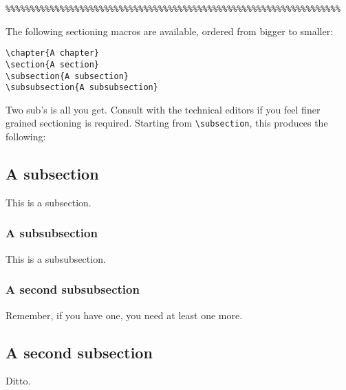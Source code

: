 \begin{verbatim}
%%%%%%%%%%%%%%%%%%%%%%%%%%%%%%%%%%%%%%%%%%%%%%%%%%%%%%%%%%%%%%%%%%%%
\end{verbatim}

The following sectioning macros are available, ordered from bigger to smaller:

\begin{verbatim}
\chapter{A chapter}
\section{A section}
\subsection{A subsection}
\subsubsection{A subsubsection}
\end{verbatim}

Two sub's is all you get.  
Consult with the technical editors if you feel finer grained
sectioning is required.
Starting from \verb|\subsection|, this produces the following:

\subsection{A subsection}
\label{sec:latex-sec-sub}

This is a subsection.

\subsubsection{A subsubsection}
\label{sec:latex-sec-subsub}

This is a subsubsection.

\subsubsection{A second subsubsection}
\label{sec:latex-sec-subsub2}

Remember, if you have one, you need at least one more.

\subsection{A second subsection}
\label{sec:latex-sub2}

Ditto.
